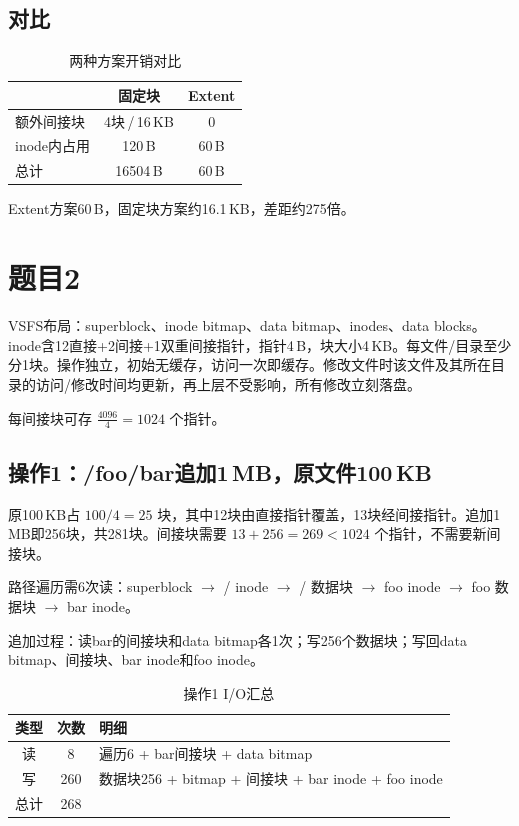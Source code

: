 \documentclass[fleqn]{ctexart}
\begin{document}
\subsection*{对比}

\begin{table}[H]
\centering
\caption{两种方案开销对比}
\begin{tabular}{l|c|c}
\hline
& 固定块 & Extent \\
\hline
额外间接块 & 4块\,/\,16\,KB & 0 \\
inode内占用 & 120\,B & 60\,B \\
\hline
总计 & 16504\,B & 60\,B \\
\hline
\end{tabular}
\end{table}

Extent方案60\,B，固定块方案约16.1\,KB，差距约275倍。

\section*{题目2}

VSFS布局：superblock、inode bitmap、data bitmap、inodes、data blocks。inode含12直接+2间接+1双重间接指针，指针4\,B，块大小4\,KB。每文件/目录至少分1块。操作独立，初始无缓存，访问一次即缓存。修改文件时该文件及其所在目录的访问/修改时间均更新，再上层不受影响，所有修改立刻落盘。

每间接块可存 $\frac{4096}{4}=1024$ 个指针。

\subsection*{操作1：/foo/bar追加1\,MB，原文件100\,KB}

原100\,KB占 $100/4=25$ 块，其中12块由直接指针覆盖，13块经间接指针。追加1\,MB即256块，共281块。间接块需要 $13+256=269<1024$ 个指针，不需要新间接块。

路径遍历需6次读：superblock $\to$ / inode $\to$ / 数据块 $\to$ foo inode $\to$ foo 数据块 $\to$ bar inode。

追加过程：读bar的间接块和data bitmap各1次；写256个数据块；写回data bitmap、间接块、bar inode和foo inode。

\begin{table}[H]
\centering
\caption{操作1 I/O汇总}
\begin{tabular}{c|c|l}
\hline
类型 & 次数 & 明细 \\
\hline
读 & 8 & 遍历6 + bar间接块 + data bitmap \\
写 & 260 & 数据块256 + bitmap + 间接块 + bar inode + foo inode \\
\hline
总计 & 268 & \\
\hline
\end{tabular}
\end{table}
\end{document}
